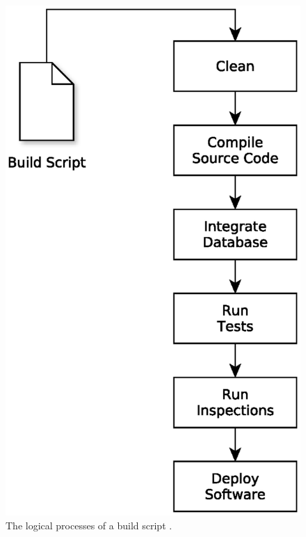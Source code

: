 \begin{figure}[H]
	\centering
	\includegraphics[scale=0.5]{yEd/the_logical_processes_of_a_build_script.eps}
	\caption{The logical processes of a build script \cite{CIbook}.}
	\label{fig:lpobs}
\end{figure}

